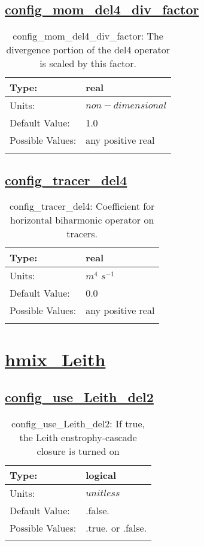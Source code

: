 \subsection[config\_mom\_del4\_div\_factor]{\hyperref[sec:nm_tab_hmix_del4]{config\_mom\_del4\_div\_factor}}
\label{subsec:nm_sec_config_mom_del4_div_factor}
\begin{center}
\begin{longtable}{| p{2.0in} || p{4.0in} |}
    \hline
    Type: & real \\
    \hline
    Units: & $non-dimensional$ \\
    \hline
    Default Value: & 1.0 \\
    \hline
    Possible Values: & any positive real \\
    \hline
    \caption{config\_mom\_del4\_div\_factor: The divergence portion of the del4 operator is scaled by this factor.}
\end{longtable}
\end{center}
\subsection[config\_tracer\_del4]{\hyperref[sec:nm_tab_hmix_del4]{config\_tracer\_del4}}
\label{subsec:nm_sec_config_tracer_del4}
\begin{center}
\begin{longtable}{| p{2.0in} || p{4.0in} |}
    \hline
    Type: & real \\
    \hline
    Units: & $m^4$ $s^{-1}$ \\
    \hline
    Default Value: & 0.0 \\
    \hline
    Possible Values: & any positive real \\
    \hline
    \caption{config\_tracer\_del4: Coefficient for horizontal biharmonic operator on tracers.}
\end{longtable}
\end{center}
\section[hmix\_Leith]{\hyperref[sec:nm_tab_hmix_Leith]{hmix\_Leith}}
\label{sec:nm_sec_hmix_Leith}
\subsection[config\_use\_Leith\_del2]{\hyperref[sec:nm_tab_hmix_Leith]{config\_use\_Leith\_del2}}
\label{subsec:nm_sec_config_use_Leith_del2}
\begin{center}
\begin{longtable}{| p{2.0in} || p{4.0in} |}
    \hline
    Type: & logical \\
    \hline
    Units: & $unitless$ \\
    \hline
    Default Value: & .false. \\
    \hline
    Possible Values: & .true. or .false. \\
    \hline
    \caption{config\_use\_Leith\_del2: If true, the Leith enstrophy-cascade closure is turned on}
\end{longtable}
\end{center}
